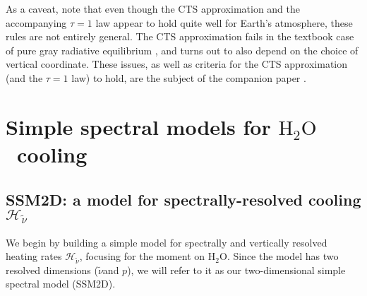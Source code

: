 \documentclass{ametsoc}
\newcommand{\eqnref}[1]{(\ref{#1})}
\newcommand{\der}[2]{\ensuremath{\frac{d #1}{d #2}}}
\newcommand{\partialder}[2]{\ensuremath{\frac{\partial #1}{\partial #2}}}
\newcommand{\ppp}{\ensuremath{\partial_p}}
\newcommand{\htwo}{\ensuremath{\mathrm{H_2O}}}
\newcommand{\wv}{\ensuremath{\widetilde{\nu}}}
\newcommand{\trans}{\ensuremath{\mathcal{T}}}
\newcommand{\ch}{\ensuremath{\mathcal{H}}}
\newcommand{\chk}{\ensuremath{\ch_{\wv}}}
\newcommand{\CTS}{\ensuremath{\mathrm{CTS}}}
\begin{document}
 As a caveat, note that even though the CTS approximation and the accompanying $\tau=1$ law appear to hold quite well for Earth's atmosphere, these rules are not entirely general. The CTS approximation fails in the textbook case of pure gray radiative equilibrium \citep[which has zero radiative cooling everywhere,][]{pierrehumbert2010}, and turns out to also depend on the choice of vertical coordinate. These issues, as well as criteria for the CTS approximation (and the $\tau=1$ law) to hold,  are the subject of the companion paper   \cite{jeevanjee2019b}.
 
% 
\section{Simple spectral models for  \htwo\ cooling} \label{sec_h2o_theory}

\subsection{SSM2D: a model for spectrally-resolved cooling \chk} \label{sec_h2o_spectral}
We begin by building a simple model for spectrally and vertically resolved heating rates \chk, focusing for the moment on \htwo. Since the model has two resolved dimensions (\wv and $p$), we will refer to it as our two-dimensional simple spectral model (SSM2D).
\end{document}
